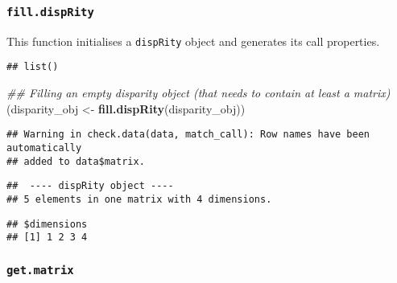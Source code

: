 \documentclass[
]{book}
\newenvironment{Shaded}{\begin{snugshade}}{\end{snugshade}}
\newcommand{\CommentTok}[1]{\textcolor[rgb]{0.56,0.35,0.01}{\textit{#1}}}
\newcommand{\KeywordTok}[1]{\textcolor[rgb]{0.13,0.29,0.53}{\textbf{#1}}}
\newcommand{\NormalTok}[1]{#1}
\newcommand{\OperatorTok}[1]{\textcolor[rgb]{0.81,0.36,0.00}{\textbf{#1}}}
\newcommand{\StringTok}[1]{\textcolor[rgb]{0.31,0.60,0.02}{#1}}
\begin{document}
\hypertarget{fill.disprity}{%
\subsubsection{\texorpdfstring{\texttt{fill.dispRity}}{fill.dispRity}}\label{fill.disprity}}

This function initialises a \texttt{dispRity} object and generates its call properties.

\begin{Shaded}
\end{Shaded}

\begin{verbatim}
## list()
\end{verbatim}

\begin{Shaded}
\begin{Highlighting}[]
\CommentTok{\#\# Filling an empty disparity object (that needs to contain at least a matrix)}
\NormalTok{(disparity\_obj \textless{}{-}}\StringTok{ }\KeywordTok{fill.dispRity}\NormalTok{(disparity\_obj))}
\end{Highlighting}
\end{Shaded}

\begin{verbatim}
## Warning in check.data(data, match_call): Row names have been automatically
## added to data$matrix.
\end{verbatim}

\begin{verbatim}
##  ---- dispRity object ---- 
## 5 elements in one matrix with 4 dimensions.
\end{verbatim}

\begin{Shaded}
\end{Shaded}

\begin{verbatim}
## $dimensions
## [1] 1 2 3 4
\end{verbatim}

\hypertarget{get.matrix}{%
\subsubsection{\texorpdfstring{\texttt{get.matrix}}{get.matrix}}\label{get.matrix}}
\end{document}
